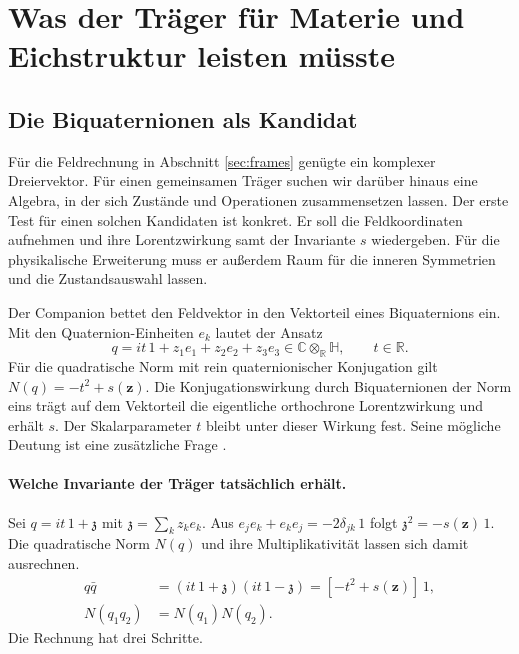 \section{Was der Träger für Materie und Eichstruktur leisten müsste}
\label{sec:shared-carrier}

\subsection{Die Biquaternionen als Kandidat}

Für die Feldrechnung in Abschnitt \ref{sec:frames} genügte ein komplexer Dreiervektor. Für einen gemeinsamen Träger suchen wir darüber hinaus eine Algebra, in der sich Zustände und Operationen zusammensetzen lassen. Der erste Test für einen solchen Kandidaten ist konkret. Er soll die Feldkoordinaten aufnehmen und ihre Lorentzwirkung samt der Invariante \(s\) wiedergeben. Für die physikalische Erweiterung muss er außerdem Raum für die inneren Symmetrien und die Zustandsauswahl lassen.

Der Companion bettet den Feldvektor in den Vektorteil eines Biquaternions ein. Mit den Quaternion-Einheiten \(e_k\) lautet der Ansatz
\begin{equation}
 q=it\,1+z_1e_1+z_2e_2+z_3e_3\in\mathbb C\otimes_{\mathbb R}\mathbb H,\qquad t\in\mathbb R .
 \label{eq:biquaternion}
\end{equation}
Für die quadratische Norm mit rein quaternionischer Konjugation gilt \(N(q)=-t^2+s(\mathbf z)\). Die Konjugationswirkung durch Biquaternionen der Norm eins trägt auf dem Vektorteil die eigentliche orthochrone Lorentzwirkung und erhält \(s\). Der Skalarparameter \(t\) bleibt unter dieser Wirkung fest. Seine mögliche Deutung ist eine zusätzliche Frage \cite{feldkern,grundidee}.

\paragraph{Welche Invariante der Träger tatsächlich erhält.}
Sei \(q=it\,1+\mathfrak z\) mit \(\mathfrak z=\sum_k z_k e_k\). Aus \(e_j e_k+e_ke_j=-2\delta_{jk}\,1\) folgt \(\mathfrak z^2=-s(\mathbf z)\,1\). Die quadratische Norm \(N(q)\) und ihre Multiplikativität lassen sich damit ausrechnen.
\begin{align}
 q\bar q&=(it\,1+\mathfrak z)(it\,1-\mathfrak z)
       =[-t^2+s(\mathbf z)]\,1,\\
 N(q_1q_2)&=N(q_1)N(q_2).
 \label{eq:biquaternion-check}
\end{align}
Die Rechnung hat drei Schritte.

